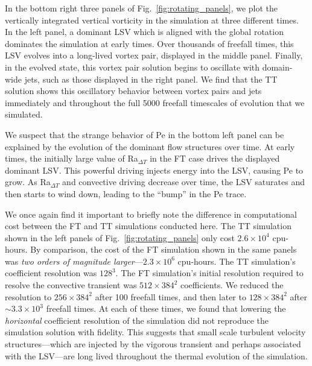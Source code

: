 \documentclass[aps, pre, onecolumn, nofootinbib, notitlepage, groupedaddress, amsfonts, amssymb, amsmath, longbibliography, superscriptaddress]{revtex4-1}
\begin{document}
In the bottom right three panels of Fig.~\ref{fig:rotating_panels}, we plot the vertically integrated vertical vorticity in the simulation at three different times.
In the left panel, a dominant LSV which is aligned with the global rotation dominates the simulation at early times.
Over thousands of freefall times, this LSV evolves into a long-lived vortex pair, displayed in the middle panel.
Finally, in the evolved state, this vortex pair solution begins to oscillate with domain-wide jets, such as those displayed in the right panel.
We find that the TT solution shows this oscillatory behavior between vortex pairs and jets immediately and throughout the full 5000 freefall timescales of evolution that we simulated.

We suspect that the strange behavior of Pe in the bottom left panel can be explained by the evolution of the dominant flow structures over time.
At early times, the initially large value of Ra$_{\Delta T}$ in the FT case drives the displayed dominant LSV.
This powerful driving injects energy into the LSV, causing Pe to grow.
As Ra$_{\Delta T}$ and convective driving decrease over time, the LSV saturates and then starts to wind down, leading to the ``bump'' in the Pe trace.

We once again find it important to briefly note the difference in computational cost between the FT and TT simulations conducted here.
The TT simulation shown in the left panels of Fig.~\ref{fig:rotating_panels} only cost $2.6 \times 10^4$ cpu-hours.
By comparison, the cost of the FT simulation shown in the same panels was \emph{two orders of magnitude larger}---$2.3 \times 10^6$ cpu-hours.
The TT simulation's coefficient resolution was $128^3$.
The FT simulation's initial resolution required to resolve the convective transient was $512\times384^2$ coefficients.
We reduced the resolution to $256\times384^2$ after 100 freefall times, and then later to $128\times384^2$ after $\sim3.3 \times 10^3$ freefall times.
At each of these times, we found that lowering the \emph{horizontal} coefficient resolution of the simulation did not reproduce the simulation solution with fidelity.
This suggests that small scale turbulent velocity structures---which are injected by the vigorous transient and perhaps associated with the LSV---are long lived throughout the thermal evolution of the simulation.
\end{document}

